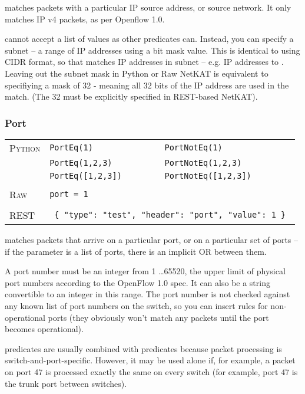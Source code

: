  matches packets with a particular IP source address, or source network.  It only matches
IP v4 packets, as per Openflow 1.0.  

 cannot accept a list of values as other predicates can.  
Instead, you can specify a subnet -- a range
of IP addresses using a bit mask value.  This is identical to using CIDR format, so that 
 matches IP addresses in subnet  -- e.g. 
IP addresses  to .  Leaving out the subnet mask in Python 
or Raw NetKAT is equivalent to specifiying a mask of 32 - meaning all 32 bits of the IP address are used
in the match.  (The 32 must be explicitly specified in REST-based NetKAT).


\subsubsection{Port}

\bigskip
\begin{tabularx}{\linewidth}{lXX}
\textsc{Python} 	& \texttt{PortEq(1)} 		& \texttt{PortNotEq(1)} \\
	 	& \texttt{PortEq(1,2,3)} 	& \texttt{PortNotEq(1,2,3)} \\
	 	& \texttt{PortEq([1,2,3])} 	& \texttt{PortNotEq([1,2,3])} \\ \\
\textsc{Raw}		& \texttt{port = 1} 		& \\ \\
\textsc{REST}	& \multicolumn{2}{l}{\texttt{ \{ "type": "test", "header": "port", "value": 1 \} }} 
\end{tabularx}

 matches packets that arrive on a particular port, or on a particular set of ports -- if the 
parameter is a list of ports, there is an implicit OR between them.  

A port number must be an integer from
1 \ldots 65520, the upper limit of physical port numbers according to the OpenFlow 1.0 spec.  It can also be 
a string convertible to an integer in this range.  The port number is not checked against any known list
of port numbers on the switch, so you can insert rules for non-operational ports (they obviously won't
match any packets until the port becomes operational).  

 predicates are usually combined with  predicates because packet processing
is switch-and-port-specific.  However, it may be used alone if, for example, a packet on port 47 is processed exactly
the same on every switch (for example, port 47 is the trunk port between switches).  

